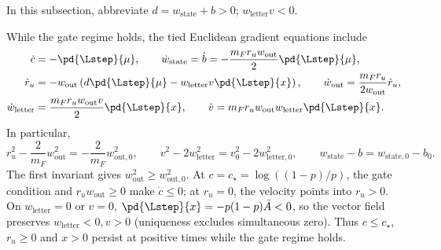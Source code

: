 In this subsection, abbreviate $d=w_{\mathrm{state}}+b>0$; $w_{\mathrm{letter}}v<0$.

While the gate regime holds, the tied Euclidean gradient equations include
\begin{align}
 \dot c&=-\pd{\Lstep}{\mu},\qquad
 \dot w_{\mathrm{state}}=\dot b=-\frac{m_Fr_uw_{\mathrm{out}}}{2}\pd{\Lstep}{\mu},
 \label{eq:lr-factor-u}\\
 \dot r_u&=-w_{\mathrm{out}}\left(d\pd{\Lstep}{\mu}-w_{\mathrm{letter}}v\pd{\Lstep}{x}\right),\qquad
 \dot w_{\mathrm{out}}=\frac{m_Fr_u}{2w_{\mathrm{out}}}\dot r_u,\\
 \dot w_{\mathrm{letter}}&=\frac{m_Fr_uw_{\mathrm{out}}v}{2}\pd{\Lstep}{x},\qquad
 \dot v=m_Fr_uw_{\mathrm{out}}w_{\mathrm{letter}}\pd{\Lstep}{x}.
 \label{eq:lr-factor-bv}
\end{align}
In particular,
\begin{equation}\label{eq:lr-factor-invariants}
 r_u^2-\frac{2}{m_F}w_{\mathrm{out}}^2=-\frac{2}{m_F}w_{\mathrm{out},0}^2,
 \qquad
 v^2-2w_{\mathrm{letter}}^2=v_0^2-2w_{\mathrm{letter},0}^2,
 \qquad w_{\mathrm{state}}-b=w_{\mathrm{state},0}-b_0.
\end{equation}
The first invariant gives $w_{\mathrm{out}}^2\ge w_{\mathrm{out},0}^2$.
At $c=c_\star=\log((1-p)/p)$, the gate condition and $r_uw_{\mathrm{out}}\ge0$
make $\dot c\le0$; at $r_u=0$, the velocity points into $r_u>0$.
On $w_{\mathrm{letter}}=0$ or $v=0$,
$\pd{\Lstep}{x}=-p(1-p)\bar A<0$, so the vector field preserves
$w_{\mathrm{letter}}<0,v>0$ (uniqueness excludes simultaneous zero).
Thus $c\le c_\star$, $r_u\ge0$ and $x>0$ persist at positive times
while the gate regime holds.

